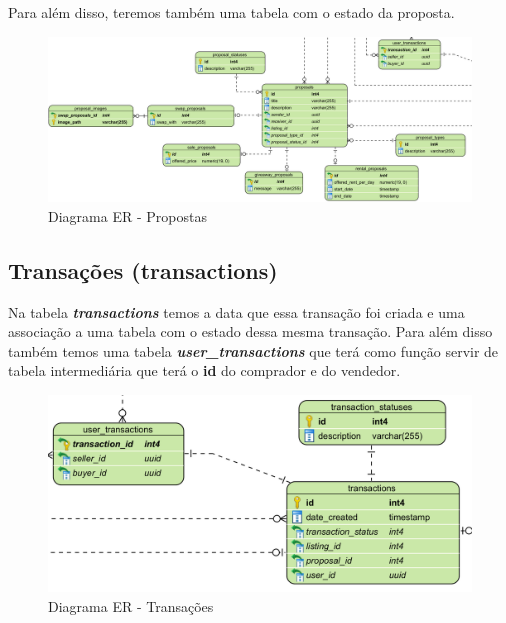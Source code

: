 \documentclass[a4paper, 12pt]{article} %
\begin{document}
Para além disso, teremos também uma tabela com o estado da proposta.

\begin{figure}[H]
	\centering
	\includegraphics[width=\textwidth]{../images/entity-relationship-diagram-proposals.png}
	\caption{Diagrama ER - Propostas}
	\label{fig:ER Proposals}
\end{figure}

\newpage

\subsection{\textbf{Transações (transactions)}}
Na tabela \textbf{\textit{transactions}} temos a data que essa transação foi criada e uma associação a uma tabela com o estado dessa mesma transação. Para além disso também temos uma tabela \textbf{\textit{user\_transactions}} que terá como função servir de tabela intermediária que terá o \textbf{id} do comprador e do vendedor. 
\begin{figure}[H]
	\centering
	\includegraphics[width=\textwidth]{../images/entity-relationship-diagram-transactions.png}
	\caption{Diagrama ER - Transações}
	\label{fig:diagrama_er}
\end{figure}


\clearpage
\newpage
\end{document}
